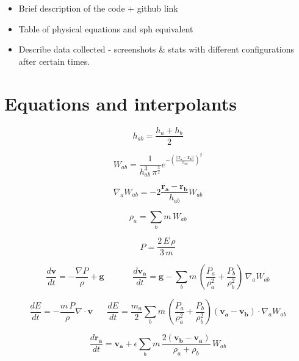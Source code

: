 \documentclass[../main.tex]{subfiles}
\begin{document}
\begin{itemize}
    \item Brief description of the code + github link
    \item Table of physical equations and sph equivalent
    \item Describe data collected - screenshots \& stats with different configurations after certain
        times.
\end{itemize}

\section{Equations and interpolants}

\begin{equation}
    h_{ab} = \frac{h_a + h_b}{2}
\end{equation}

\begin{equation}
    W_{ab} = \frac{1}{h_{ab}^3 \, \pi^{\frac{3}{2}}} e^{-(\frac{||\bm{r_a} - \bm{r_b}||}{h_{ab}})^2}
\end{equation}

\begin{equation}
    \nabla_a W_{ab} = -2 \frac{\bm{r_a} - \bm{r_b}}{h_{ab}} W_{ab}
\end{equation}

\begin{equation}
    \rho_a = \sum_b m \, W_{ab}
\end{equation}

\begin{equation}
    P = \frac{2 \, E \, \rho}{3 \, m}
\end{equation}

\begin{equation}
    \frac{d\bm{v}}{dt}
    = -\frac{\nabla P}{\rho} + \bm{g}
    \hspace{20pt}
    \hspace{20pt}
    \frac{d\bm{v_a}}{dt}
    = \bm{g} - \sum_b m \, (\frac{P_a}{\rho_a^2} + \frac{P_b}{\rho_b^2}) \, \nabla_a W_{ab}
\end{equation}

\begin{equation}
    \frac{dE}{dt}
    = - \frac{m \, P}{\rho} \nabla \cdot \bm{v}
    \hspace{20pt}
    \frac{dE}{dt}
    = \frac{m_a}{2} \sum_b m \, (\frac{P_a}{\rho_a^2} + \frac{P_b}{\rho_b^2}) (\bm{v_a} - \bm{v_b})
    \cdot \nabla_a W_{ab}
\end{equation}

\begin{equation}
    \frac{d\bm{r_a}}{dt}
    = \bm{v_a} + \epsilon \sum_b m \, \frac{2 (\bm{v_b} - \bm{v_a})}{\rho_a + \rho_b} \, W_{ab}
\end{equation}
\end{document}
